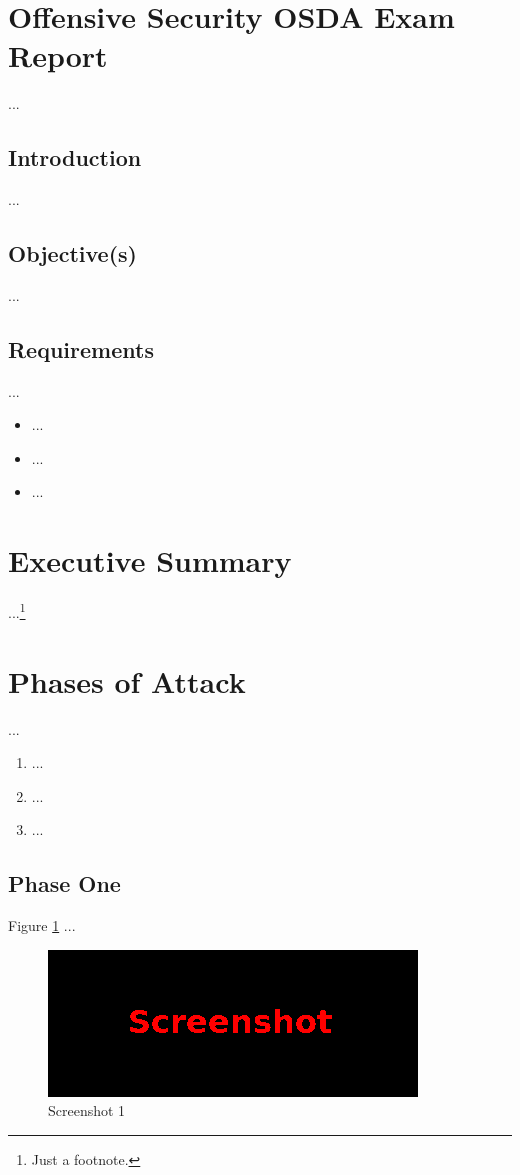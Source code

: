 %
%
%
\section{Offensive Security OSDA Exam Report}\label{sec:sec1}
%
...
%
%
%
\subsection{Introduction}\label{sec:sec1-intro}
%
...
%
%
%
\subsection{Objective(s)}\label{sec:sec1-obj}
%
...
%
%
%
\subsection{Requirements}\label{sec:sec1-req}
%
...

\begin{itemize}
    \item ...
    \item ...
    \item ...
\end{itemize}
%
%
%
\section{Executive Summary}\label{sec:sec2}
%
...\footnote{Just a footnote.}
%
%
%
\section{Phases of Attack}\label{sec:sec3}
%
...

\begin{enumerate}
    \item ...
    \item ...
    \item ...
\end{enumerate}
%
%
%
\subsection{Phase One}\label{sec:sec3-phase1}
%
Figure \ref{fig:sec3-phase1-screen1} ...

\begin{figure}[H]
    \centering
    \includegraphics[width=\textwidth]{img/assignment1/screen1.png}
    \caption{Screenshot 1}\label{fig:sec3-phase1-screen1}
\end{figure}
%
%
%
